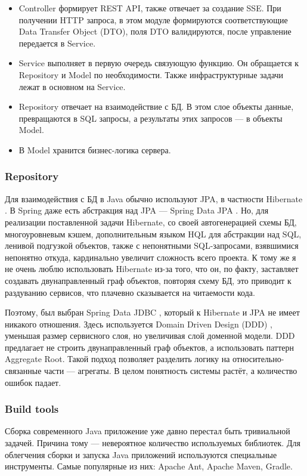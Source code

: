 \begin{itemize}
    \item Controller формирует REST API, также отвечает за создание SSE.
          При получении HTTP запроса, в этом модуле формируются соответствующие Data Transfer Object (DTO),
          поля DTO валидируются, после управление передается в Service.
    \item Service выполняет в первую очередь связующую функцию.
          Он обращается к Repository и Model по необходимости.
          Также инфраструктурные задачи лежат в основном на Service.
    \item Repository отвечает на взаимодействие с БД.
          В этом слое объекты данные, превращаются в SQL запросы, а результаты этих запросов --- в объекты Model.
    \item В Model хранится бизнес-логика сервера.
\end{itemize}

\subsubsection{Repository}
Для взаимодействия с БД в Java обычно используют JPA, в частности Hibernate \cite{HibernateReference}.
В Spring даже есть абстракция над JPA --- Spring Data JPA \cite{SpringDataJPAReference}.
Но, для реализации поставленной задачи Hibernate, со своей автогенерацией схемы БД, многоуровневым кэшем, дополнительным языком HQL для абстракции над SQL, ленивой подгузкой объектов, также с непонятными SQL-запросами, взявшимися непонятно откуда, кардинально увеличит сложность всего проекта.
К тому же я не очень люблю использовать Hibernate из-за того, что он, по факту, заставляет создавать двунаправленный граф объектов, повторяя схему БД, это приводит к раздуванию сервисов, что плачевно сказывается на читаемости кода.

Поэтому, был выбран Spring Data JDBC \cite{SpringDataJDBCReference}, который к Hibernate и JPA не имеет никакого отношения.
Здесь используется Domain Driven Design (DDD) \cite{EricEvansDDD}, уменьшая размер сервисного слоя, но увеличивая слой доменной модели.
DDD предлагает не строить двунаправленный граф объектов, а использовать паттерн Aggregate Root.
Такой подход позволяет разделить логику на относительно-связанные части --- агрегаты.
В целом понятность системы растёт, а количество ошибок падает.

\subsubsection{Build tools}
Сборка современного Java приложение уже давно перестал быть тривиальной задачей.
Причина тому --- невероятное количество используемых библиотек.
Для облегчения сборки и запуска Java приложений используются специальные инструменты.
Самые популярные из них: Apache Ant, Apache Maven, Gradle.

